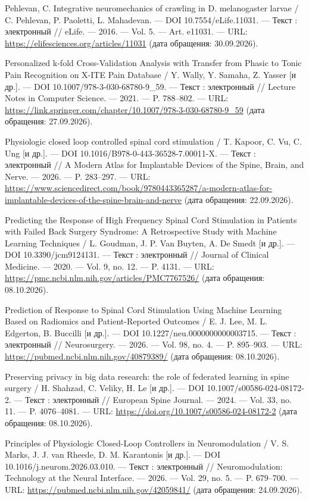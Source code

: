 \begin{list}{}{\setlength{\leftmargin}{10mm}\setlength{\labelwidth}{8mm}\setlength{\labelsep}{2mm}\setlength{\itemsep}{0pt}\setlength{\parsep}{0pt}\setlength{\topsep}{0pt}}
\item[227.] Pehlevan, C. Integrative neuromechanics of crawling in D. melanogaster larvae / C. Pehlevan, P. Paoletti, L. Mahadevan. — DOI 10.7554/eLife.11031. — Текст : электронный // eLife. — 2016. — Vol. 5. — Art. e11031. — URL: \url{https://elifesciences.org/articles/11031} (дата обращения: 30.09.2026).
\item[228.] Personalized k-fold Cross-Validation Analysis with Transfer from Phasic to Tonic Pain Recognition on X-ITE Pain Database / Y. Wally, Y. Samaha, Z. Yasser [и др.]. — DOI 10.1007/978-3-030-68780-9\_59. — Текст : электронный // Lecture Notes in Computer Science. — 2021. — P. 788–802. — URL: \url{https://link.springer.com/chapter/10.1007/978-3-030-68780-9\_59} (дата обращения: 27.09.2026).
\item[229.] Physiologic closed loop controlled spinal cord stimulation / T. Kapoor, C. Vu, C. Ung [и др.]. — DOI 10.1016/B978-0-443-36528-7.00011-X. — Текст : электронный // A Modern Atlas for Implantable Devices of the Spine, Brain, and Nerve. — 2026. — P. 283–297. — URL: \url{https://www.sciencedirect.com/book/9780443365287/a-modern-atlas-for-implantable-devices-of-the-spine-brain-and-nerve} (дата обращения: 22.09.2026).
\item[230.] Predicting the Response of High Frequency Spinal Cord Stimulation in Patients with Failed Back Surgery Syndrome: A Retrospective Study with Machine Learning Techniques / L. Goudman, J. P. Van Buyten, A. De Smedt [и др.]. — DOI 10.3390/jcm9124131. — Текст : электронный // Journal of Clinical Medicine. — 2020. — Vol. 9, no. 12. — P. 4131. — URL: \url{https://pmc.ncbi.nlm.nih.gov/articles/PMC7767526/} (дата обращения: 08.10.2026).
\item[231.] Prediction of Response to Spinal Cord Stimulation Using Machine Learning Based on Radiomics and Patient-Reported Outcomes / E. J. Lee, M. L. Edgerton, B. Buccilli [и др.]. — DOI 10.1227/neu.0000000000003715. — Текст : электронный // Neurosurgery. — 2026. — Vol. 98, no. 4. — P. 895–903. — URL: \url{https://pubmed.ncbi.nlm.nih.gov/40879389/} (дата обращения: 08.10.2026).
\item[232.] Preserving privacy in big data research: the role of federated learning in spine surgery / H. Shahzad, C. Veliky, H. Le [и др.]. — DOI 10.1007/s00586-024-08172-2. — Текст : электронный // European Spine Journal. — 2024. — Vol. 33, no. 11. — P. 4076–4081. — URL: \url{https://doi.org/10.1007/s00586-024-08172-2} (дата обращения: 08.10.2026).
\item[233.] Principles of Physiologic Closed-Loop Controllers in Neuromodulation / V. S. Marks, J. J. van Rheede, D. M. Karantonis [и др.]. — DOI 10.1016/j.neurom.2026.03.010. — Текст : электронный // Neuromodulation: Technology at the Neural Interface. — 2026. — Vol. 29, no. 5. — P. 679–700. — URL: \url{https://pubmed.ncbi.nlm.nih.gov/42059841/} (дата обращения: 24.09.2026).

\end{list}
